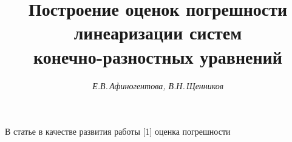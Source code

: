 






\newcommand{\tts}[1]{}







\setcounter{page}{75}















\author{\it Е.В.\,Афиногентова, В.Н.\,Щенников}




\title{Построение оценок погрешности линеаризации систем\\


конечно-разностных уравнений}





\date{}




\pagestyle{plain} %







\maketitle


\label{begin}








В статье в качестве развития работы [1] оценка погрешности


